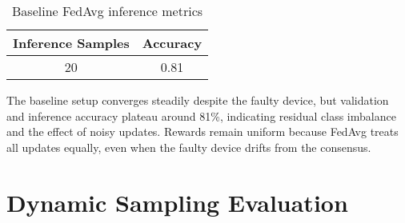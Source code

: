 \begin{table}[h!]
    \centering
    \caption{Baseline FedAvg inference metrics}
    \label{tab:baseline_inference}
    \begin{tabular}{c c}
        \toprule
        \textbf{Inference Samples} & \textbf{Accuracy} \\
        \midrule
        20 & 0.81 \\
        \bottomrule
    \end{tabular}
\end{table}

The baseline setup converges steadily despite the faulty device, but validation and inference accuracy plateau around 81\%, indicating residual class imbalance and the effect of noisy updates. Rewards remain uniform because FedAvg treats all updates equally, even when the faulty device drifts from the consensus.

\section{Dynamic Sampling Evaluation}

